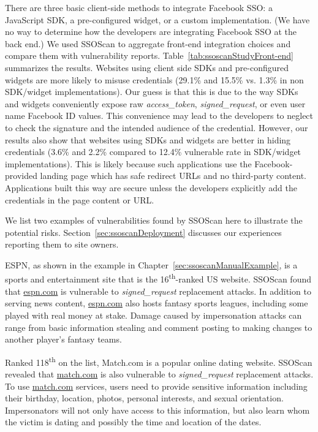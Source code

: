  There are three basic client-side methods to integrate Facebook SSO: a JavaScript SDK, a pre-configured widget, or a custom implementation.  (We have no way to determine how the developers are integrating Facebook SSO at the back end.)  We used SSOScan to aggregate front-end integration choices and compare them with vulnerability reports.  Table~\ref{tab:ssoscanStudyFront-end} summarizes the results.  Websites using client side SDKs and pre-configured widgets are more likely to misuse credentials (29.1\% and 15.5\% vs. 1.3\% in non SDK/widget implementations).  Our guess is that this is due to the way SDKs and widgets conveniently expose raw \emph{access\_token}, \emph{signed\_request}, or even user name Facebook ID values.  This convenience may lead to the developers to neglect to check the signature and the intended audience of the credential.  However, our results also show that websites using SDKs and widgets are better in hiding credentials (3.6\% and 2.2\% compared to 12.4\% vulnerable rate in SDK/widget implementations).  This is likely because such applications use the Facebook-provided landing page which has safe redirect URLs and no third-party content.  Applications built this way are secure unless the developers explicitly add the credentials in the page content or URL.



 We list two examples of vulnerabilities found by SSOScan here to illustrate the potential risks.  Section~\ref{sec:ssoscanDeployment} discusses our experiences reporting them to site owners.

 ESPN, as shown in the example in Chapter~\ref{sec:ssoscanManualExample}, is a sports and entertainment site that is the 16\textsuperscript{th}-ranked US website.  SSOScan found that \url{espn.com} is vulnerable to \emph{signed\_request} replacement attacks.  In addition to serving news content, \url{espn.com} also hosts fantasy sports leagues, including some played with real money at stake.  Damage caused by impersonation attacks can range from basic information stealing and comment posting to making changes to another player's fantasy teams.

 Ranked 118\textsuperscript{th} on the list, Match.com is a popular online dating website.  SSOScan revealed that \url{match.com} is also vulnerable to \emph{signed\_request} replacement attacks.  To use \url{match.com} services, users need to provide sensitive information including their birthday, location, photos, personal interests, and sexual orientation.  Impersonators will not only have access to this information, but also learn whom the victim is dating and possibly the time and location of the dates.

